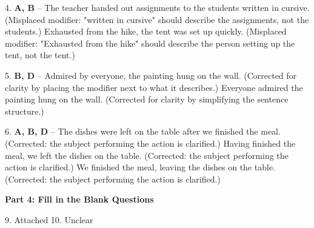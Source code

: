 \documentclass[12pt]{article}
\begin{document}
4. \textbf{A, B} – The teacher handed out assignments to the students written in cursive. (Misplaced modifier: "written in cursive" should describe the assignments, not the students.)  
Exhausted from the hike, the tent was set up quickly. (Misplaced modifier: "Exhausted from the hike" should describe the person setting up the tent, not the tent.)

5. \textbf{B, D} – Admired by everyone, the painting hung on the wall. (Corrected for clarity by placing the modifier next to what it describes.)  
Everyone admired the painting hung on the wall. (Corrected for clarity by simplifying the sentence structure.)

6. \textbf{A, B, D} – The dishes were left on the table after we finished the meal. (Corrected: the subject performing the action is clarified.)  
Having finished the meal, we left the dishes on the table. (Corrected: the subject performing the action is clarified.)  
We finished the meal, leaving the dishes on the table. (Corrected: the subject performing the action is clarified.)

\textbf{Part 4: Fill in the Blank Questions}

9. Attached  
10. Unclear  
\end{document}

